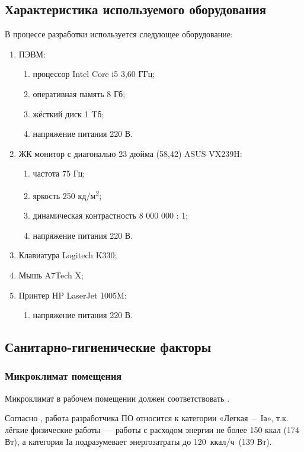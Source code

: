 \subsection{Характеристика используемого оборудования}
В процессе разработки используется следующее оборудование:
\begin{enumerate}
	\item{ПЭВМ:}
		\begin{enumerate}
			\item{процессор Intel Core i5 3,60 ГГц;}
			\item{оперативная память 8 Гб;}
			\item{жёсткий диск 1 Tб;}
			\item{напряжение питания 220 В.}
		\end{enumerate}
	\item{ЖК монитор с диагональю 23 дюйма (58,42) ASUS VX239H:}
		\begin{enumerate}
			\item{частота 75 Гц;}
			\item{яркость 250 кд/м\textsuperscript{2};}
			\item{динамическая контрастность 8 000 000 : 1;}
			\item{напряжение питания 220 В.}
		\end{enumerate}
	\item{Клавиатура Logitech K330;}
	\item{Мышь A7Tech X;}
	\item{Принтер HP LaserJet 1005M:}
		\begin{enumerate}
			\item{напряжение питания 220 В.}
		\end{enumerate}
\end{enumerate}

\subsection{Санитарно-гигиенические факторы}

\subsubsection{Микроклимат помещения}
Микроклимат в рабочем помещении должен соответствовать \cite{GOST12_1_005}.

Согласно \cite{GOST12_1_005}, работа разработчика ПО относится к категории «Легкая~–~Iа», т.к. лёгкие физические работы~--- работы с расходом энергии не более 150 ккал (174 Вт), а категория Iа подразумевает энергозатраты до 120~ккал/ч~(139 Вт).

